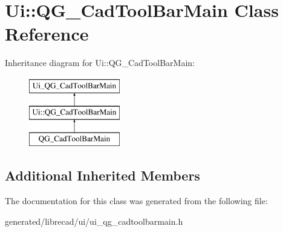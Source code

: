 \hypertarget{classUi_1_1QG__CadToolBarMain}{\section{Ui\-:\-:Q\-G\-\_\-\-Cad\-Tool\-Bar\-Main Class Reference}
\label{classUi_1_1QG__CadToolBarMain}
}
Inheritance diagram for Ui\-:\-:Q\-G\-\_\-\-Cad\-Tool\-Bar\-Main\-:\begin{figure}[H]
\begin{center}
\leavevmode
\includegraphics[height=3.000000cm]{classUi_1_1QG__CadToolBarMain}
\end{center}
\end{figure}
\subsection*{Additional Inherited Members}


The documentation for this class was generated from the following file\-:\begin{DoxyCompactItemize}
\item 
generated/librecad/ui/ui\-\_\-qg\-\_\-cadtoolbarmain.\-h\end{DoxyCompactItemize}
